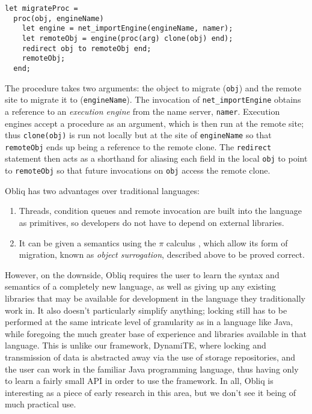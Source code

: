 \begin{verbatim}
let migrateProc =
  proc(obj, engineName)
    let engine = net_importEngine(engineName, namer);
    let remoteObj = engine(proc(arg) clone(obj) end);
    redirect obj to remoteObj end;
    remoteObj;
  end;
\end{verbatim}

The procedure takes two arguments: the object to migrate
(\texttt{obj}) and the remote site to migrate it to
(\texttt{engineName}).  The invocation of \texttt{net\_importEngine}
obtains a reference to an \emph{execution engine} from the name
server, \texttt{namer}.  Execution engines accept a procedure as an
argument, which is then run at the remote site; thus
\texttt{clone(obj)} is run not locally but at the site of
\texttt{engineName} so that \texttt{remoteObj} ends up being a
reference to the remote clone.  The \texttt{redirect} statement then
acts as a shorthand for aliasing each field in the local \texttt{obj}
to point to \texttt{remoteObj} so that future invocations on
\texttt{obj} access the remote clone.

Obliq has two advantages over traditional languages:

\begin{enumerate}
\item Threads, condition queues and remote invocation are built into
  the language as primitives, so developers do not have to depend on
  external libraries.
\item It can be given a semantics using the $\pi$ calculus
  \cite{obliqsem}, which allow its form of migration, known as
  \emph{object surrogation}, described above to be proved correct.
\end{enumerate}

However, on the downside, Obliq requires the user to learn the syntax
and semantics of a completely new language, as well as giving up any
existing libraries that may be available for development in the
language they traditionally work in.  It also doesn't particularly
simplify anything; locking still has to be performed at the same
intricate level of granularity as in a language like Java, while
foregoing the much greater base of experience and libraries available
in that language.  This is unlike our framework, DynamiTE, where
locking and transmission of data is abstracted away via the use of
storage repositories, and the user can work in the familiar Java
programming language, thus having only to learn a fairly small API in
order to use the framework.  In all, Obliq is interesting as a piece
of early research in this area, but we don't see it being of much
practical use.

